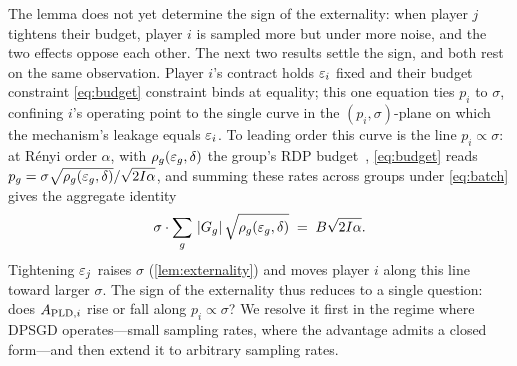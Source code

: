 The lemma does not yet determine the sign of the externality: when
player $j$ tightens their budget, player $i$ is sampled more but
under more noise, and the two effects oppose each other. The next
two results settle the sign, and both rest on the same observation.
Player $i$'s contract holds $\varepsilon_i$ fixed and their budget constraint \eqref{eq:budget}
constraint binds at equality; this one equation ties $p_i$ to
$\sigma$, confining $i$'s operating point to the single curve in
the $(p_i, \sigma)$-plane on which the mechanism's leakage equals
$\varepsilon_i$. To leading order this curve is the line $p_i \propto
\sigma$: at R\'enyi order $\alpha$, with $\rho_g(\varepsilon_g,\delta)$
the group's \ac{RDP} budget~\cite{mironov2017renyi}, \eqref{eq:budget} reads
$p_g = \sigma\sqrt{\rho_g(\varepsilon_g,\delta)}/\sqrt{2I\alpha}$, and
summing these rates across groups under \eqref{eq:batch} gives the aggregate
identity
\begin{equation}
\sigma \cdot \sum_{g}\, |G_g|\, \sqrt{\rho_g(\varepsilon_g,\delta)} \;=\; B
\sqrt{2I\alpha}.
\label{eq:sigma-implicit}
\end{equation}
Tightening $\varepsilon_j$ raises $\sigma$ (\cref{lem:externality}) and
moves player $i$ along this line toward larger $\sigma$. The sign
of the externality thus reduces to a single question: does
$A_{\mathrm{PLD},i}$ rise or fall along $p_i \propto \sigma$? We resolve it
first in the regime where \ac{DPSGD} operates---small sampling
rates, where the advantage admits a closed form---and then extend
it to arbitrary sampling rates.


